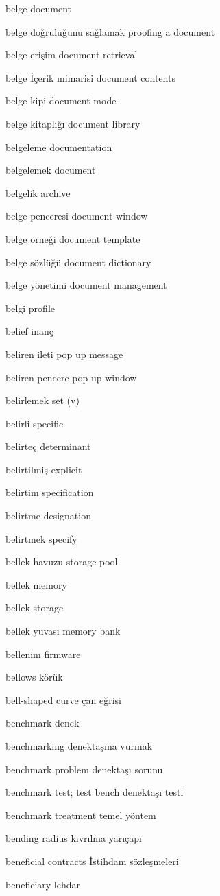 \documentclass[12pt,fleqn]{article}\usepackage{../../common}
\begin{document}
belge document

belge doğruluğunu sağlamak proofing a document

belge erişim document retrieval

belge İçerik mimarisi document contents

belge kipi document mode

belge kitaplığı document library

belgeleme documentation

belgelemek document

belgelik archive

belge penceresi document window

belge örneği document template

belge sözlüğü document dictionary

belge yönetimi document management

belgi profile

belief inanç

beliren ileti pop up message

beliren pencere pop up window

belirlemek set (v)

belirli specific

belirteç determinant

belirtilmiş explicit

belirtim specification

belirtme designation

belirtmek specify

bellek havuzu storage pool

bellek memory

bellek storage

bellek yuvası memory bank

bellenim firmware

bellows körük

bell-shaped curve çan eğrisi

benchmark denek

benchmarking denektaşına vurmak

benchmark problem denektaşı sorunu

benchmark test; test bench denektaşı testi

benchmark treatment temel yöntem

bending radius kıvrılma yarıçapı

beneficial contracts İstihdam sözleşmeleri

beneficiary lehdar
\end{document}
